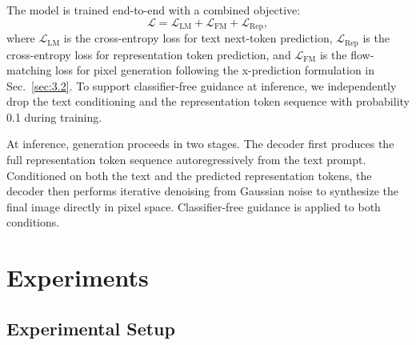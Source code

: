 \documentclass{llmxive}
\begin{document}
The model is trained end-to-end with a combined objective:
\begin{equation}
    \mathcal{L} = \mathcal{L}_{\text{LM}} + \mathcal{L}_{\text{FM}} + \mathcal{L}_{\text{Rep}},
\end{equation}
where $\mathcal{L}_{\text{LM}}$ is the cross-entropy loss for text next-token prediction, $\mathcal{L}_{\text{Rep}}$ is the cross-entropy loss for representation token prediction, and $\mathcal{L}_{\text{FM}}$ is the flow-matching loss for pixel generation following the x-prediction formulation in Sec.~\ref{sec:3.2}. To support classifier-free guidance at inference, we independently drop the text conditioning and the representation token sequence with probability 0.1 during training.

At inference, generation proceeds in two stages. The decoder first produces the full representation token sequence autoregressively from the text prompt. Conditioned on both the text and the predicted representation tokens, the decoder then performs iterative denoising from Gaussian noise to synthesize the final image directly in pixel space. Classifier-free guidance is applied to both conditions.

\section{Experiments}

\subsection{Experimental Setup}
\label{sec:exp_setup}
\end{document}
